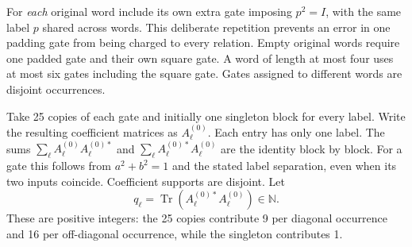 \documentclass[11pt,a4paper]{article}
\newcommand{\N}{\mathbb N}
\newcommand{\Tr}{\operatorname{Tr}}
\begin{document}
For \emph{each} original word include its own extra gate imposing $p^2=I$, with the same label $p$ shared across words. This deliberate repetition prevents an error in one padding gate from being charged to every relation. Empty original words require one padded gate and their own square gate. A word of length at most four uses at most six gates including the square gate. Gates assigned to different words are disjoint occurrences.

Take 25 copies of each gate and initially one singleton block for every label. Write the resulting coefficient matrices as $A_\ell^{(0)}$. Each entry has only one label. The sums $\sum_\ell A_\ell^{(0)}A_\ell^{(0)*}$ and $\sum_\ell A_\ell^{(0)*}A_\ell^{(0)}$ are the identity block by block. For a gate this follows from $a^2+b^2=1$ and the stated label separation, even when its two inputs coincide. Coefficient supports are disjoint. Let
\[
 q_\ell=\Tr(A_\ell^{(0)*}A_\ell^{(0)})\in\N.
\]
These are positive integers: the 25 copies contribute 9 per diagonal occurrence and 16 per off-diagonal occurrence, while the singleton contributes 1.
\end{document}
